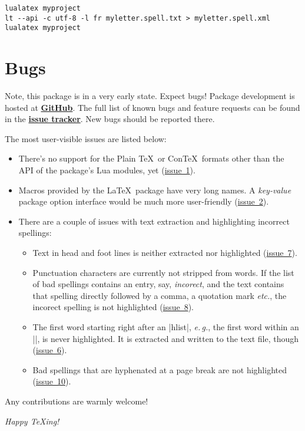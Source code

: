 \documentclass[11pt]{article}
\newcommand*{\acr}[1]{\mbox{\scshape#1}}
\newcommand*{\latinphrase}[1]{\foreignlanguage{latin}{\emph{#1}}}
\newcommand*{\lpeg}{\latinphrase{e.\,g.}\xspace}
\newcommand*{\lpetc}{\latinphrase{etc.}\xspace}
\begin{document}
\begin{lstlisting}
lualatex myproject
lt --api -c utf-8 -l fr myletter.spell.txt > myletter.spell.xml
lualatex myproject
\end{lstlisting}


\section{Bugs}
\label{sec:bugs}

Note, this package is in a very early state.  Expect bugs!  Package
development is hosted at
\href{http://github.com/sh2d/spelling/}{\bfseries GitHub}.  The full
list of known bugs and feature requests can be found in the
\href{http://github.com/sh2d/spelling/issues/}{\bfseries issue tracker}.
New bugs should be reported there.

The most user-visible issues are listed below:

\begin{itemize}

\item There's no support for the Plain \TeX\ or Con\TeX\ formats other
  than the \acr{API} of the package's Lua modules, yet
  (\href{https://github.com/sh2d/spelling/issues/1}{issue~1}).

\item Macros provided by the \LaTeX\ package have very long names.  A
  \emph{key-value} package option interface would be much more
  user-friendly
  (\href{https://github.com/sh2d/spelling/issues/2}{issue~2}).

\item There are a couple of issues with text extraction and highlighting
  incorrect spellings:

  \begin{itemize}

  \item Text in head and foot lines is neither extracted nor highlighted
    (\href{https://github.com/sh2d/spelling/issues/7}{issue~7}).

  \item Punctuation characters are currently not stripped from words.
    If the list of bad spellings contains an entry, say,
    \emph{incorect}, and the text contains that spelling directly
    followed by a comma, a quotation mark \lpetc, the incorect spelling
    is not highlighted
    (\href{https://github.com/sh2d/spelling/issues/8}{issue~8}).

  \item The first word starting right after an |hlist|, \lpeg, the first
    word within an |\mbox|, is never highlighted.  It is extracted and
    written to the text file, though
    (\href{https://github.com/sh2d/spelling/issues/6}{issue~6}).

  \item Bad spellings that are hyphenated at a page break are not
    highlighted
    (\href{https://github.com/sh2d/spelling/issues/10}{issue~10}).

  \end{itemize}


\end{itemize}

Any contributions are warmly welcome!

\bigskip
\emph{Happy \TeX ing!}
\end{document}
